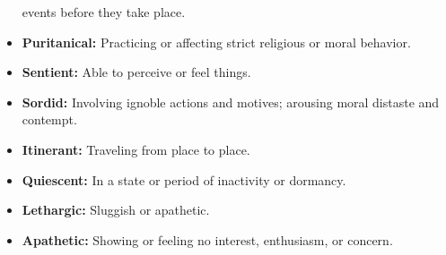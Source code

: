 \documentclass[crop=false,class=book]{standalone}
\begin{document}
\begin{itemize}[noitemsep]
                      events before they take place.
                \item \textbf{Puritanical:} Practicing or affecting strict
                      religious or moral behavior.
                \item \textbf{Sentient:} Able to perceive or feel things.
                \item \textbf{Sordid:} Involving ignoble actions and motives;
                      arousing moral distaste and contempt.
                \item \textbf{Itinerant:} Traveling from place to place.
                \item \textbf{Quiescent:} In a state or period of inactivity
                      or dormancy.
                \item \textbf{Lethargic:} Sluggish or apathetic.
                \item \textbf{Apathetic:} Showing or feeling no interest,
                      enthusiasm, or concern.
            \end{itemize}
\end{document}
